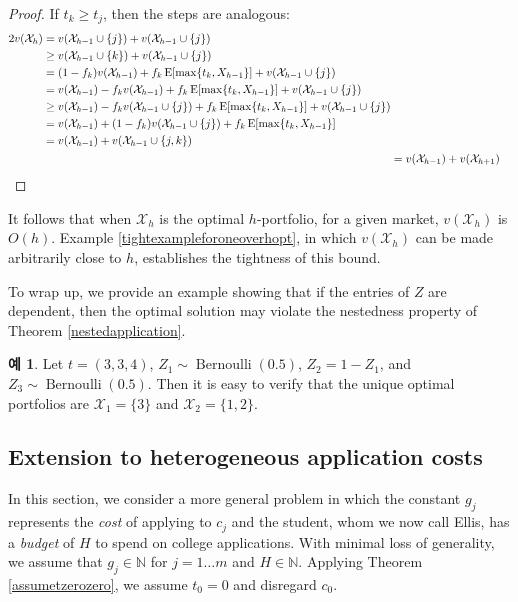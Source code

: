\documentclass[12pt]{article} %
\theoremstyle{definition}
\newtheorem{example}{Example}
\theoremstyle{definition}
\newtheorem{example}{예}
\begin{document}
\begin{proof}
If $t_k \geq t_j$, then the steps are analogous:
\begin{align}
\begin{split}
2 v(\mathcal{X}_h) &= v(\mathcal{X}_{h-1} \cup\{j\}) + v(\mathcal{X}_{h-1} \cup\{j\}) \\
&\geq v(\mathcal{X}_{h-1} \cup\{k\}) + v(\mathcal{X}_{h-1} \cup\{j\}) \\
&= (1 - f_k) v(\mathcal{X}_{h-1}) + f_k \operatorname{E}[\max\{t_k, X_{h-1}\}] +  v(\mathcal{X}_{h-1} \cup\{j\})  \\
&= v(\mathcal{X}_{h-1}) - f_k  v(\mathcal{X}_{h-1}) + f_k \operatorname{E}[\max\{t_k, X_{h-1}\}] +  v(\mathcal{X}_{h-1} \cup\{j\})  \\
&\geq v(\mathcal{X}_{h-1}) - f_k  v(\mathcal{X}_{h-1}\cup\{j\}) + f_k \operatorname{E}[\max\{t_k, X_{h-1}\}] +  v(\mathcal{X}_{h-1} \cup\{j\})  \\
&= v(\mathcal{X}_{h-1}) + (1 - f_k) v(\mathcal{X}_{h-1}\cup\{j\}) + f_k \operatorname{E}[\max\{t_k, X_{h-1}\}]  \\
&= v(\mathcal{X}_{h-1}) + v(\mathcal{X}_{h-1} \cup\{j, k\})
\end{split}\\
&= v(\mathcal{X}_{h-1})  + v(\mathcal{X}_{h+1}) \qedhere
\end{align}
\end{proof}

It follows that when $\mathcal{X}_h$ is the optimal $h$-portfolio, for a given market, $v(\mathcal{X}_h)$ is $O(h)$. Example \ref{tightexampleforoneoverhopt}, in which $v(\mathcal{X}_h)$ can be made arbitrarily close to $h$, establishes the tightness of this bound.

To wrap up, we provide an example showing that if the entries of $Z$ are dependent, then the optimal solution may violate the nestedness property of Theorem \ref{nestedapplication}.
\begin{example}
Let $t = (3, 3, 4)$, $Z_1 \sim \operatorname{Bernoulli}(0.5)$, $Z_2 = 1 - Z_1$,  and $Z_3 \sim \operatorname{Bernoulli}(0.5)$. Then it is easy to verify that the unique optimal portfolios are $\mathcal{X}_1 = \{3\}$ and $\mathcal{X}_2 = \{1, 2\}$. 
\end{example}








\subsection{Extension to heterogeneous application costs}
In this section, we consider a more general problem in which the constant $g_j$ represents the \emph{cost} of applying to $c_j$ and the student, whom we now call Ellis, has a \emph{budget} of $H$ to spend on college applications. With minimal loss of generality, we assume that $g_j \in \mathbb{N}$ for $j = 1\dots m$ and $H \in\mathbb{N}$. Applying Theorem \ref{assumetzerozero}, we assume $t_0 = 0$ and disregard $c_0$.
\end{document}
